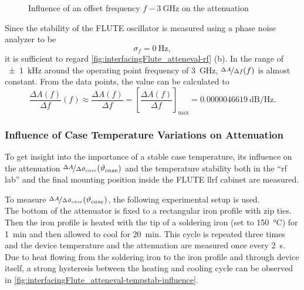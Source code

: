 \begin{figure}[tb]
    \centering
        \subfloat[$f=f_o \SI{+-30}{\kHz}$]{}
        \qquad
        \subfloat[$f=f_o \SI{+-1}{\kHz}$]{}
       \caption{Influence of an offset frequency $f-\SI{3}{\GHz}$ on the attenuation }
    \label{fig:interfacingFlute_atteneval-rf}
\end{figure}

Since the stability of the FLUTE oscillator is measured using a phase noise analyzer to be
\begin{equation}
\sigma_f = \SI{0}{\hertz},
\end{equation}
it is sufficient to regard \autoref{fig:interfacingFlute_atteneval-rf} (b). In the range of \SI{\pm1}{\kHz} around the operating point frequency of \SI{3}{\GHz}, $\nicefrac{\Delta A}{\Delta f} (f)$ is almost constant. From the data points, the value can be calculated to
\begin{equation}
\frac{\Delta A(f)}{\Delta f}(f) 
\approx \frac{\Delta A(f)}{\Delta f} 
= \left[\frac{\Delta A(f)}{\Delta f}\right]_\text{max}
=\SI{0.0000046619}{\dB\per\hertz}.
\end{equation}

\subsubsection{Influence of Case Temperature Variations on Attenuation}
To get insight into the importance of a stable case temperature, its influence on the attenuation $\nicefrac{\Delta A}{\Delta \vartheta_{case}} (\vartheta_{case})$ and the temperature stability both in the ``\gls{rf} lab'' and the final mounting position inside the FLUTE \gls{llrf} cabinet are measured.

To measure $\nicefrac{\Delta A}{\Delta \vartheta_{case}} (\vartheta_{case})$, the following experimental setup is used.\\
The bottom of the attenuator is fixed to a rectangular iron profile with zip ties. Then the iron profile is heated with the tip of a soldering iron (set to \SI{150}{\degreeCelsius}) for \SI{1}{\minute} and then allowed to cool for \SI{20}{\minute}. This cycle is repeated three times and the device temperature and the attenuation are measured once every \SI{2}{\second}. Due to heat flowing from the soldering iron to the iron profile and through device itself, a strong hysteresis between the heating and cooling cycle can be observed in \autoref{fig:interfacingFlute_atteneval-tempstab-influence}.

